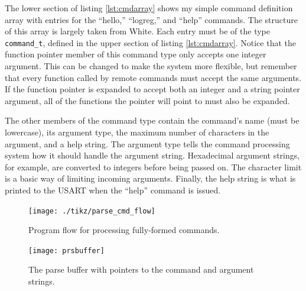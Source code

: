 The lower section of listing \ref{lst:cmdarray} shows my simple command definition array with entries for the ``hello,'' ``logreg,'' and ``help'' commands. The structure of this array is largely taken from White\cite{bok:white2012}.  Each entry must be of the type \texttt{command\_t}, defined in the upper section of listing \ref{lst:cmdarray}.  Notice that the function pointer member of this command type only accepts one integer argument.  This can be changed to make the system more flexible, but remember that every function called by remote commands must accept the same arguments.  If the function pointer is expanded to accept both an integer and a string pointer argument, all of the functions the pointer will point to must also be expanded.  

The other members of the command type contain the command's name (must be lowercase), its argument type, the maximum number of characters in the argument, and a help string.  The argument type tells the command processing system how it should handle the argument string.  Hexadecimal argument strings, for example, are converted to integers before being passed on.  The character limit is a basic way of limiting incoming arguments.  Finally, the help string is what is printed to the USART when the ``help'' command is issued.


\begin{figure}[ht]
    \begin{center}
        \texttt{[image: ./tikz/parse\_cmd\_flow]}
        \caption{Program flow for processing fully-formed commands.\label{fig:cmdflow}}
    \end{center}
\end{figure}

\begin{figure}[ht]
    \begin{center}
        \texttt{[image: prsbuffer]}
        \caption{The parse buffer with pointers to the command and argument strings.\label{fig:prsbuffer}}
    \end{center}
\end{figure}

